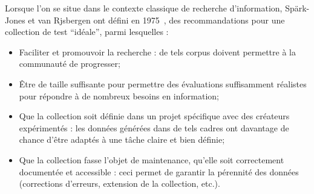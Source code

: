 Lorsque l'on se situe dans le contexte classique de recherche d'information, Spärk-Jones et van Rjsbergen ont défini en 1975~\cite{sparkrijs1975}, des recommandations pour une collection de test ``idéale'', parmi lesquelles :
\begin{itemize}
\item Faciliter et promouvoir la recherche : de tels corpus doivent permettre à la communauté de progresser;
\item Être de taille suffisante pour permettre des évaluations suffisamment réalistes pour répondre à de nombreux besoins en information;
\item Que la collection soit définie dans un projet spécifique avec des créateurs expérimentés : les données générées dans de tels cadres ont davantage de chance d'être adaptés à une tâche claire et bien définie;
\item Que la collection fasse l'objet de maintenance, qu'elle soit correctement documentée et accessible : ceci permet de garantir la pérennité des données (corrections d'erreurs, extension de la collection, etc.).
\end{itemize}

